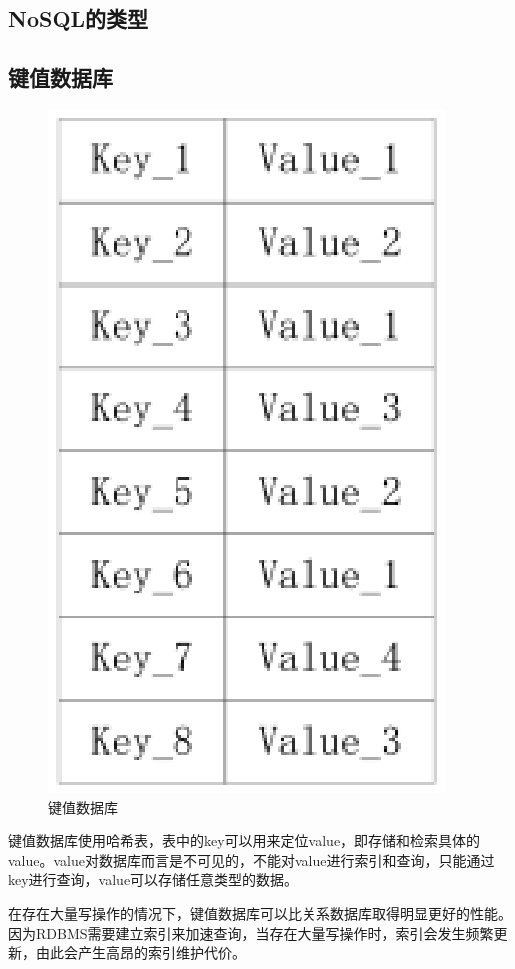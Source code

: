 \documentclass{article}
\begin{document}
\begin{large}
  \section{NoSQL的类型}
  \subsection{键值数据库}
  \begin{figure}[h]
    \centering
    \includegraphics{3.eps}
    \caption{键值数据库}
  \end{figure}
  键值数据库使用哈希表，表中的key可以用来定位value，即存储和检索具体的value。value对数据库而言是不可见的，不能对value进行索引和查询，只能通过key进行查询，value可以存储任意类型的数据。

  在存在大量写操作的情况下，键值数据库可以比关系数据库取得明显更好的性能。因为RDBMS需要建立索引来加速查询，当存在大量写操作时，索引会发生频繁更新，由此会产生高昂的索引维护代价。


\end{large}
\end{document}
